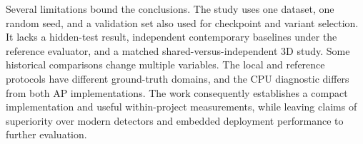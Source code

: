 Several limitations bound the conclusions. The study uses one dataset, one random seed, and a validation set also used for checkpoint and variant selection. It lacks a hidden-test result, independent contemporary baselines under the reference evaluator, and a matched shared-versus-independent 3D study. Some historical comparisons change multiple variables. The local and reference protocols have different ground-truth domains, and the CPU diagnostic differs from both AP implementations. The work consequently establishes a compact implementation and useful within-project measurements, while leaving claims of superiority over modern detectors and embedded deployment performance to further evaluation.
